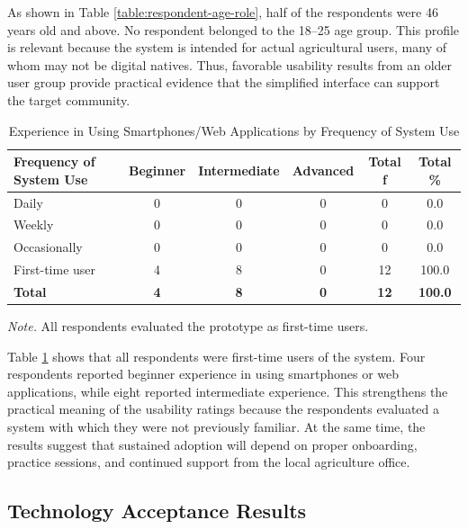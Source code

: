 As shown in Table \ref{table:respondent-age-role}, half of the respondents were 46 years old and above. No respondent belonged to the 18--25 age group. This profile is relevant because the system is intended for actual agricultural users, many of whom may not be digital natives. Thus, favorable usability results from an older user group provide practical evidence that the simplified interface can support the target community.

\begin{table}[htbp]
\vspace{2ex}
\centering
\caption{Experience in Using Smartphones/Web Applications by Frequency of System Use}
\label{table:experience-frequency}
\begin{tabular}{p{3.8cm}ccccc}
\hline
\hline
\textbf{Frequency of System Use} & \textbf{Beginner} & \textbf{Intermediate} & \textbf{Advanced} & \textbf{Total f} & \textbf{Total \%} \\
\hline
Daily & 0 & 0 & 0 & 0 & 0.0 \\
Weekly & 0 & 0 & 0 & 0 & 0.0 \\
Occasionally & 0 & 0 & 0 & 0 & 0.0 \\
First-time user & 4 & 8 & 0 & 12 & 100.0 \\
\hline
\textbf{Total} & \textbf{4} & \textbf{8} & \textbf{0} & \textbf{12} & \textbf{100.0} \\
\hline
\hline
\end{tabular}
\vspace{1ex}

\begin{flushleft}
\footnotesize{\textit{Note.} All respondents evaluated the prototype as first-time users.}
\end{flushleft}
\vspace{2ex}
\end{table}

Table \ref{table:experience-frequency} shows that all respondents were first-time users of the system. Four respondents reported beginner experience in using smartphones or web applications, while eight reported intermediate experience. This strengthens the practical meaning of the usability ratings because the respondents evaluated a system with which they were not previously familiar. At the same time, the results suggest that sustained adoption will depend on proper onboarding, practice sessions, and continued support from the local agriculture office.

\subsection{Technology Acceptance Results}

